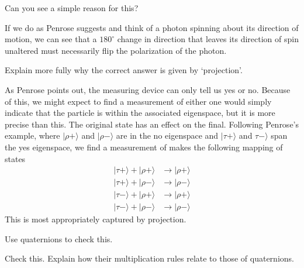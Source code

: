 \documentclass[../road-to-reality.tex]{subfiles}
\begin{document}
\begin{questions}
\question Can you see a simple reason for this?

\begin{solution}
	If we do as Penrose suggests and think of a photon spinning about its direction of motion, we can see that a $180^\circ$ change in direction that leaves its direction of spin unaltered must necessarily flip the polarization of the photon.
\end{solution}

\question Explain more fully why the correct answer is given by `projection'.
	
\begin{solution}
	As Penrose points out, the measuring device can only tell us yes or no. Because of this, we might expect to find a measurement of either one would simply indicate that the particle is within the associated eigenspace, but it is more precise than this. The original state has an effect on the final. Following Penrose's example, where $|\rho+\rangle$ and $|\rho-\rangle$ are in the no eigenspace and $|\tau+\rangle$ and $\tau-\rangle$ span the yes eigenspace, we find a measurement of makes the following mapping of states
	\begin{align*}
		|\tau+\rangle + |\rho+\rangle &\to |\rho+\rangle \\
		|\tau+\rangle + |\rho-\rangle &\to |\rho-\rangle \\
		|\tau-\rangle + |\rho+\rangle &\to |\rho+\rangle \\
		|\tau-\rangle + |\rho-\rangle &\to |\rho-\rangle
	\end{align*}
	This is most appropriately captured by projection.
\end{solution}

\question Use quaternions to check this.

\question Check this. Explain how their multiplication rules relate to those of quaternions.


\end{questions}
\end{document}
